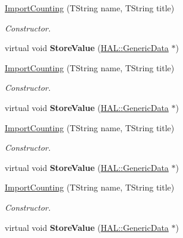 \begin{DoxyCompactItemize}
\item 
\hyperlink{class_h_a_l_1_1_algorithms_1_1_import_counting_a533c67ebac3fbcb71c800ccb794bdf24}{Import\+Counting} (T\+String name, T\+String title)
\begin{DoxyCompactList}\small\item\em Constructor. \end{DoxyCompactList}\item 
\hypertarget{class_h_a_l_1_1_algorithms_1_1_import_counting_a5c11aa12b91c4fbe66a76d4acbfd0033}{virtual void {\bfseries Store\+Value} (\hyperlink{class_h_a_l_1_1_generic_data}{H\+A\+L\+::\+Generic\+Data} $\ast$)}\label{class_h_a_l_1_1_algorithms_1_1_import_counting_a5c11aa12b91c4fbe66a76d4acbfd0033}

\item 
\hyperlink{class_h_a_l_1_1_algorithms_1_1_import_counting_a533c67ebac3fbcb71c800ccb794bdf24}{Import\+Counting} (T\+String name, T\+String title)
\begin{DoxyCompactList}\small\item\em Constructor. \end{DoxyCompactList}\item 
\hypertarget{class_h_a_l_1_1_algorithms_1_1_import_counting_a5c11aa12b91c4fbe66a76d4acbfd0033}{virtual void {\bfseries Store\+Value} (\hyperlink{class_h_a_l_1_1_generic_data}{H\+A\+L\+::\+Generic\+Data} $\ast$)}\label{class_h_a_l_1_1_algorithms_1_1_import_counting_a5c11aa12b91c4fbe66a76d4acbfd0033}

\item 
\hyperlink{class_h_a_l_1_1_algorithms_1_1_import_counting_a533c67ebac3fbcb71c800ccb794bdf24}{Import\+Counting} (T\+String name, T\+String title)
\begin{DoxyCompactList}\small\item\em Constructor. \end{DoxyCompactList}\item 
\hypertarget{class_h_a_l_1_1_algorithms_1_1_import_counting_a5c11aa12b91c4fbe66a76d4acbfd0033}{virtual void {\bfseries Store\+Value} (\hyperlink{class_h_a_l_1_1_generic_data}{H\+A\+L\+::\+Generic\+Data} $\ast$)}\label{class_h_a_l_1_1_algorithms_1_1_import_counting_a5c11aa12b91c4fbe66a76d4acbfd0033}

\item 
\hyperlink{class_h_a_l_1_1_algorithms_1_1_import_counting_a533c67ebac3fbcb71c800ccb794bdf24}{Import\+Counting} (T\+String name, T\+String title)
\begin{DoxyCompactList}\small\item\em Constructor. \end{DoxyCompactList}\item 
\hypertarget{class_h_a_l_1_1_algorithms_1_1_import_counting_a5c11aa12b91c4fbe66a76d4acbfd0033}{virtual void {\bfseries Store\+Value} (\hyperlink{class_h_a_l_1_1_generic_data}{H\+A\+L\+::\+Generic\+Data} $\ast$)}\label{class_h_a_l_1_1_algorithms_1_1_import_counting_a5c11aa12b91c4fbe66a76d4acbfd0033}


\end{DoxyCompactItemize}

